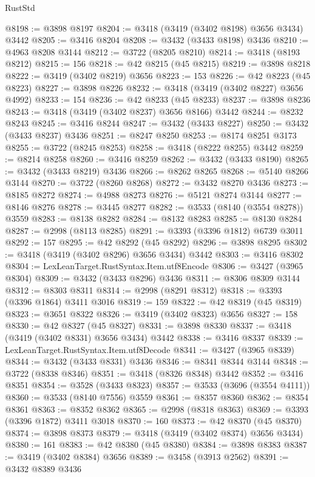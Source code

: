 \begin{lexlean}{RustStd}
\begin{coremodule}
@8198 := @3898 @8197
@8204 := @3418 (@3419 (@3402 @8198) @3656 @3434) @3442
@8205 := @3416 @8204
@8208 := @3432 (@3433 @8198) @3436
@8210 := @4963 @8208 @3144
@8212 := @3722 (@8205 @8210)
@8214 := @3418 (@8193 @8212)
@8215 := 156
@8218 := @42 @8215 (@45 @8215)
@8219 := @3898 @8218
@8222 := @3419 (@3402 @8219) @3656
@8223 := 153
@8226 := @42 @8223 (@45 @8223)
@8227 := @3898 @8226
@8232 := @3418 (@3419 (@3402 @8227) @3656 @4992)
@8233 := 154
@8236 := @42 @8233 (@45 @8233)
@8237 := @3898 @8236
@8243 := @3418 (@3419 (@3402 @8237) @3656 @8166) @3442
@8244 := @8232 @8243
@8245 := @3416 @8244
@8247 := @3432 (@3433 @8227)
@8250 := @3432 (@3433 @8237) @3436
@8251 := @8247 @8250
@8253 := @8174 @8251 @3173
@8255 := @3722 (@8245 @8253)
@8258 := @3418 (@8222 @8255) @3442
@8259 := @8214 @8258
@8260 := @3416 @8259
@8262 := @3432 (@3433 @8190)
@8265 := @3432 (@3433 @8219) @3436
@8266 := @8262 @8265
@8268 := @5140 @8266 @3144
@8270 := @3722 (@8260 @8268)
@8272 := @3432 @8270 @3436
@8273 := @8185 @8272
@8274 := @4988 @8273
@8276 := @5121 @8274 @3144
@8277 := @8146 @8276
@8278 := @3445 @8277
@8282 := @3533 (@8140 (@3554 @8278)) @3559
@8283 := @8138 @8282
@8284 := @8132 @8283
@8285 := @8130 @8284
@8287 := @2998 (@8113 @8285)
@8291 := @3393 (@3396 @1812) @6739 @3011
@8292 := 157
@8295 := @42 @8292 (@45 @8292)
@8296 := @3898 @8295
@8302 := @3418 (@3419 (@3402 @8296) @3656 @3434) @3442
@8303 := @3416 @8302
@8304 := LexLeanTarget.RustSyntax.Item.utf8Encode
@8306 := @3427 (@3965 @8304)
@8309 := @3432 (@3433 @8296) @3436
@8311 := @8306 @8309 @3144
@8312 := @8303 @8311
@8314 := @2998 (@8291 @8312)
@8318 := @3393 (@3396 @1864) @3411 @3016
@8319 := 159
@8322 := @42 @8319 (@45 @8319)
@8323 := @3651 @8322
@8326 := @3419 (@3402 @8323) @3656
@8327 := 158
@8330 := @42 @8327 (@45 @8327)
@8331 := @3898 @8330
@8337 := @3418 (@3419 (@3402 @8331) @3656 @3434) @3442
@8338 := @3416 @8337
@8339 := LexLeanTarget.RustSyntax.Item.utf8Decode
@8341 := @3427 (@3965 @8339)
@8344 := @3432 (@3433 @8331) @3436
@8346 := @8341 @8344 @3144
@8348 := @3722 (@8338 @8346)
@8351 := @3418 (@8326 @8348) @3442
@8352 := @3416 @8351
@8354 := @3528 (@3433 @8323)
@8357 := @3533 (@3696 (@3554 @4111))
@8360 := @3533 (@8140 @7556) @3559
@8361 := @8357 @8360
@8362 := @8354 @8361
@8363 := @8352 @8362
@8365 := @2998 (@8318 @8363)
@8369 := @3393 (@3396 @1872) @3411 @3018
@8370 := 160
@8373 := @42 @8370 (@45 @8370)
@8374 := @3898 @8373
@8379 := @3418 (@3419 (@3402 @8374) @3656 @3434)
@8380 := 161
@8383 := @42 @8380 (@45 @8380)
@8384 := @3898 @8383
@8387 := @3419 (@3402 @8384) @3656
@8389 := @3458 (@3913 @2562)
@8391 := @3432 @8389 @3436

\end{coremodule}
\end{lexlean}

